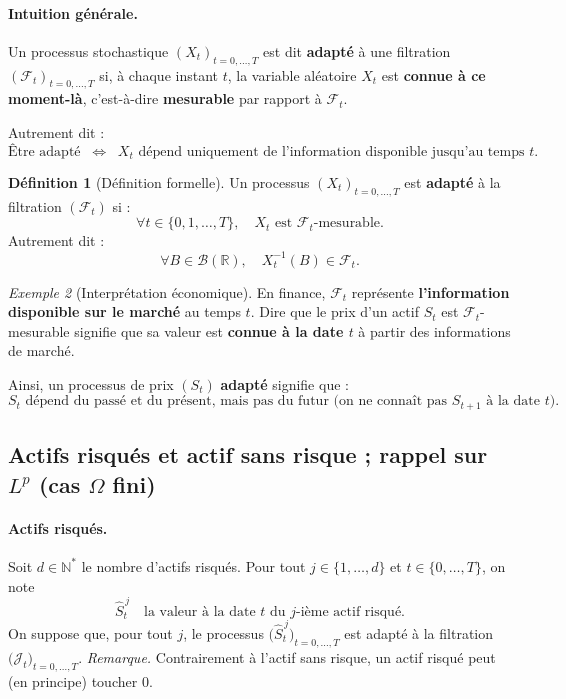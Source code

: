 \documentclass[12pt,a4paper]{article}
\numberwithin{equation}{section}
\theoremstyle{plain} %
\theoremstyle{definition} %
\newtheorem{definition}{Définition}          %
\theoremstyle{remark} %
\theoremstyle{myexample}
\newtheorem{exemple}[definition]{Exemple}
\theoremstyle{definition}
\begin{document}
\paragraph{Intuition générale.}
Un processus stochastique $(X_t)_{t=0,\dots,T}$ est dit \textbf{adapté} à une filtration $(\mathcal{F}_t)_{t=0,\dots,T}$ si, à chaque instant $t$, 
la variable aléatoire $X_t$ est \textbf{connue à ce moment-là}, c'est-à-dire \textbf{mesurable} par rapport à $\mathcal{F}_t$.

\medskip
Autrement dit :
\[
\text{Être adapté} \;\;\Longleftrightarrow\;\; X_t \text{ dépend uniquement de l'information disponible jusqu'au temps } t.
\]

\begin{definition}[Définition formelle]
Un processus $(X_t)_{t=0,\dots,T}$ est \textbf{adapté} à la filtration $(\mathcal{F}_t)$ si :
\[
\forall t \in \{0,1,\dots,T\}, \quad X_t \text{ est } \mathcal{F}_t\text{-mesurable.}
\]
Autrement dit :
\[
\forall B \in \mathcal{B}(\mathbb{R}), \quad X_t^{-1}(B) \in \mathcal{F}_t.
\]
\end{definition}

\begin{exemple} [Interprétation économique]
En finance, $\mathcal{F}_t$ représente \textbf{l'information disponible sur le marché} au temps $t$.
Dire que le prix d’un actif $S_t$ est $\mathcal{F}_t$-mesurable signifie que sa valeur est \textbf{connue à la date $t$}
à partir des informations de marché.

Ainsi, un processus de prix $(S_t)$ \textbf{adapté} signifie que :
\[
S_t \text{ dépend du passé et du présent, mais pas du futur (on ne connaît pas } S_{t+1} \text{ à la date } t).
\]
\end{exemple}



\subsection{Actifs risqués et actif sans risque ; rappel sur $L^p$ (cas $\Omega$ fini)}

\paragraph{Actifs risqués.}
Soit $d\in\mathbb{N}^*$ le nombre d’actifs risqués. Pour tout $j\in\{1,\dots,d\}$ et
$t\in\{0,\dots,T\}$, on note
\[
\hat S_t^{\,j}\quad\text{la valeur à la date }t\text{ du $j$-ième actif risqué.}
\]
On suppose que, pour tout $j$, le processus $\big(\hat S_t^{\,j}\big)_{t=0,\dots,T}$ est adapté à la
filtration $\big(\mathcal{J}_t\big)_{t=0,\dots,T}$. \emph{Remarque.} Contrairement à l’actif sans risque,
un actif risqué peut (en principe) toucher $0$.
\end{document}
